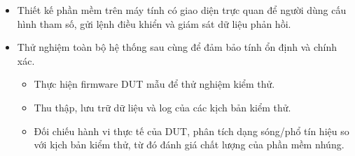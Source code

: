 \begin{itemize}
    \item Thiết kế phần mềm trên máy tính có giao diện trực quan để người dùng cấu hình tham số, gửi lệnh điều khiển và giám sát dữ liệu phản hồi.

    \item Thử nghiệm toàn bộ hệ thống sau cùng để đảm bảo tính ổn định và chính xác.
    \begin{itemize}
        \item[-] Thực hiện firmware DUT mẫu để thử nghiệm kiểm thử.
        \item[-] Thu thập, lưu trữ dữ liệu và log của các kịch bản kiểm thử.
        \item[-] Đối chiếu hành vi thực tế của DUT, phân tích dạng sóng/phổ tín hiệu so với kịch bản kiểm thử, từ đó đánh giá chất lượng của phần mềm nhúng.
    \end{itemize}
\end{itemize}


